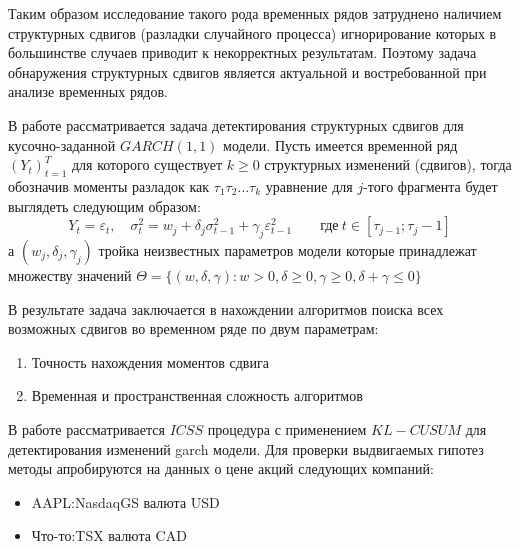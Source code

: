\documentclass[a4paper,14pt,russian]{extarticle}
\begin{document}
	\par
	Таким образом исследование такого рода временных рядов затруднено наличием структурных сдвигов (разладки случайного процесса) игнорирование которых в большинстве случаев приводит к некорректных результатам. Поэтому задача обнаружения структурных сдвигов является актуальной и востребованной при анализе временных рядов.
	\par
	В работе рассматривается задача детектирования структурных сдвигов для кусочно-заданной $GARCH(1, 1)$ модели. Пусть имеется временной ряд $(Y_t)_{t=1}^T$ для которого существует $k \geq 0$ структурных изменений (сдвигов), тогда обозначив моменты разладок как $\tau_1 \tau_2 \dots \tau_k$ уравнение для $j$-того фрагмента будет выглядеть следующим образом:
	\begin{equation}
		Y_t = \varepsilon_t, \quad \sigma_t^2 = w_j + \delta_j \sigma_{t-1}^2 + \gamma_j \varepsilon_{t-1}^2 \qquad \text{где} \ t \in \left[ \tau_{j - 1}; \tau_j - 1 \right] 
	\end{equation}
	а $(w_j, \delta_j, \gamma_j)$ тройка неизвестных параметров модели которые принадлежат множеству значений $\Theta = \{ (w, \delta, \gamma): w > 0, \delta \geq 0, \gamma \geq 0, \delta + \gamma \le 0 \} $
	\par
	В результате задача заключается в нахождении алгоритмов поиска всех возможных сдвигов во временном ряде по двум параметрам:
	\begin{enumerate}
		\item Точность нахождения моментов сдвига
		\item Временная и пространственная сложность алгоритмов
	\end{enumerate}
	\par
	В работе рассматривается $ICSS$ процедура с применением $KL-CUSUM$ для детектирования изменений garch модели. Для проверки выдвигаемых гипотез методы апробируются на данных о цене акций следующих компаний:
	\begin{itemize}
		\item AAPL:NasdaqGS валюта USD
		\item Что-то:TSX валюта CAD
	\end{itemize}
	
	
	\clearpage
\end{document}

